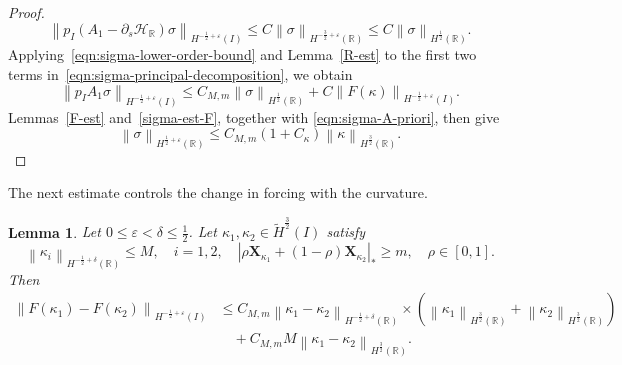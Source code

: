 \documentclass[11pt,reqno]{amsart}
\theoremstyle{plain}
\newtheorem{lemma}[theorem]{Lemma}
\theoremstyle{definition}
\numberwithin{equation}{section}
\newcommand{\paren}[1]{\left(#1\right)}
\newcommand{\p}{\partial}
\newcommand{\mc}[1]{\mathcal{#1}}
\newcommand{\wt}[1]{\widetilde{#1}}
\newcommand{\bm}[1]{\boldsymbol{#1}}
\newcommand{\abs}[1]{\left\lvert #1 \right\rvert}
\newcommand{\norm}[1]{\left\lVert #1 \right\rVert}
\newcommand{\R}{\mathbb{R}}
\newcommand{\tk}{\bm\tau_\kappa}
\newcommand{\nk}{\bm n_\kappa}
\newcommand{\xka}[1]{\bm X_{\kappa_{#1}}}
\newcommand{\hi}[1]{H^{#1}(I)}
\newcommand{\thi}[1]{\wt H^{#1}(I)}
\newcommand{\hr}[1]{H^{#1}(\R)}
\begin{document}
\begin{proof}
\begin{equation}
    \norm{p_I\paren{A_1-\p_s\mc H_{\R}}\sigma}_{\hi{-\frac{1}{2}+\varepsilon}}
    \le C\norm{\sigma}_{\hr{-\frac{3}{2}+\varepsilon}}
    \le C\norm{\sigma}_{\hr{\frac{1}{2}}} .
\end{equation}
Applying~\eqref{eqn:sigma-lower-order-bound} and Lemma~\ref{R-est} to
the first two terms in~\eqref{eqn:sigma-principal-decomposition}, we obtain
\begin{equation}
    \norm{p_I A_1\sigma}_{\hi{-\frac{1}{2}+\varepsilon}} \le{} C_{M,m}\norm{\sigma}_{\hr{\frac{1}{2}}} +
    C\norm{F(\kappa)}_{\hi{-\frac{1}{2}+\varepsilon}}.
\end{equation}
Lemmas~\ref{F-est} and~\ref{sigma-est-F}, together with
\eqref{eqn:sigma-A-priori}, then give
\begin{equation}
    \norm{\sigma}_{\hr{\frac{1}{2}+\varepsilon}}
    \le C_{M,m}(1+C_\kappa)\norm{\kappa}_{\hr{\frac{3}{2}}}.
\end{equation}
\end{proof}


The next estimate controls the change in forcing with the curvature.

\begin{lemma}\label{F-Lip-kappa}
Let $0\le \varepsilon<\delta\le \frac{1}{2}$.
Let $\kappa_1,\kappa_2 \in \thi{\frac{3}{2}}$ satisfy
\begin{equation*}
    \norm{\kappa_i}_{\hr{-\frac{1}{2}+\delta}}\le M,
    \quad i=1,2,
    \quad
    \abs{\rho \xka{1} + \paren{1-\rho}\xka{2}}_*\ge m,
    \quad \rho\in[0,1].
\end{equation*}
Then
\begin{equation}\label{eqn:forcing-difference}
\begin{aligned}
    \norm{F(\kappa_1)-F(\kappa_2)}_{\hi{-\frac{1}{2}+\varepsilon}} &\le C_{M,m}
    \norm{\kappa_1-\kappa_2}_{\hr{-\frac{1}{2}+\delta}} \times \paren{ \norm{\kappa_1}_{\hr{\frac{3}{2}}}
    +\norm{\kappa_2}_{\hr{\frac{3}{2}}} } \\
    &\quad+ C_{M,m}M \norm{\kappa_1-\kappa_2}_{\hr{\frac{3}{2}}}.
\end{aligned}
\end{equation}
\end{lemma}
\end{document}
